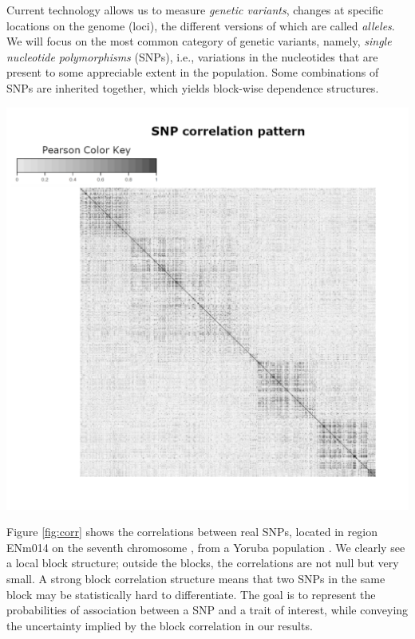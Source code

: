 \documentclass[final]{beamer}
\newenvironment{Figure}
  {\par\noindent\minipage{\linewidth}}
  {\endminipage\par}
\begin{document}
\begin{multicols*}{3}
Current technology allows us to measure \textit{genetic variants}, changes at specific locations on  the genome (loci), the different versions of which are called \textit{alleles}. We will focus on the most common category of genetic variants, namely, \textit{single nucleotide polymorphisms} (SNPs), i.e., variations in the nucleotides that are present to some appreciable extent in the population. Some combinations of SNPs are inherited together, which yields block-wise dependence structures.
\begin{Figure}
\centering
\includegraphics[width=6in]{images/corrRealSNPs.pdf}
\end{Figure}
\vspace{1em}
Figure \ref{fig:corr} shows the correlations between real SNPs, located in region ENm014 on the seventh chromosome , from a Yoruba population . We clearly see a local block structure; outside the blocks, the correlations are not null but very small. A strong block correlation structure means that two SNPs in the same block may be statistically hard to differentiate. The goal is to represent the probabilities of association between a SNP and a trait of interest, while conveying the uncertainty implied by the block correlation in our results.


\end{multicols*}
\end{document}
